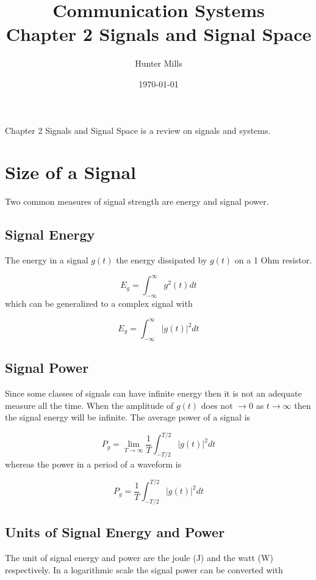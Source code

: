 \documentclass{article}
\title{Communication Systems \\
    \large Chapter 2 Signals and Signal Space}
\author{Hunter Mills}
\date{\today}
\begin{document}
    \maketitle

    \medskip
    Chapter 2 Signals and Signal Space is a review on signals and systems. 
    
    \section{Size of a Signal}
    Two common measures of signal strength are energy and signal power.

    \subsection{Signal Energy}
    The energy in a signal $g(t)$ the energy dissipated by $g(t)$ on a 1 Ohm resistor. 
    
    \begin{equation}  
        E_g = \int_{-\infty}^{\infty}g^2(t)dt
    \end{equation}
    which can be generalized to a complex signal with

    \begin{equation}
        E_g = \int_{-\infty}^{\infty}|g(t)|^2dt
    \end{equation}

    \subsection{Signal Power}
    Since some classes of signals can have infinite energy then it is not an adequate measure all the time. When the amplitude of $g(t)$ does not $\rightarrow 0$ as
    $t \rightarrow \infty$ then the signal energy will be infinite. The average power of a signal is

    \begin{equation}
        P_g = \lim_{T \rightarrow \infty} \frac{1}{T} \int_{-T/2}^{T/2} |g(t)|^2dt
    \end{equation}
    whereas the power in a period of a waveform is

    \begin{equation}
        P_g = \frac{1}{T} \int_{-T/2}^{T/2} |g(t)|^2dt
    \end{equation}

    \subsection{Units of Signal Energy and Power}
    The unit of signal energy and power are the joule (J) and the watt (W) respectively. In a logarithmic scale the signal power can be converted with
\end{document}
